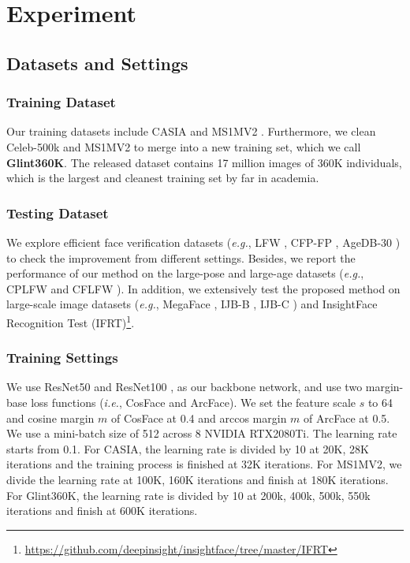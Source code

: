 \documentclass[letterpaper]{article} \usepackage{style/aaai21}  \usepackage{times}  \usepackage{helvet} \usepackage{courier}  \usepackage[hyphens]{url}  \usepackage{graphicx} \usepackage{color}
\begin{document}
\section{Experiment}
\subsection{Datasets and Settings}
\subsubsection{Training Dataset}
Our training datasets include CASIA \cite{liu2015deep} and MS1MV2 \cite{deng2019arcface}. Furthermore, we clean Celeb-500k \cite{cao2018celeb} and MS1MV2 to merge into a new training set, which we call \textbf{Glint360K}. The released dataset contains 17 million images of 360K individuals, which is the largest and cleanest training set by far in academia.

\subsubsection{Testing Dataset}
We explore efficient face verification datasets (\emph{e.g.}, LFW \cite{huang2008labeled}, CFP-FP \cite{sengupta2016frontal}, AgeDB-30 \cite{moschoglou2017agedb}) to check the improvement from different settings. Besides, we report the performance of our method on the large-pose and large-age datasets (\emph{e.g.}, CPLFW \cite{CPLFWTech} and CFLFW \cite{zheng2017cross}). In addition, we extensively test the proposed method on large-scale image datasets (\emph{e.g.}, MegaFace \cite{kemelmacher-shlizerman2016the}, IJB-B \cite{whitelam2017iarpa}, IJB-C \cite{maze2018iarpa}) and InsightFace Recognition Test (IFRT)\footnote{\url{https://github.com/deepinsight/insightface/tree/master/IFRT}}.
 


\subsubsection{Training Settings}

We use ResNet50 and ResNet100 \cite{deng2019arcface, he2016deep}, as our backbone network, and use two margin-base loss functions (\emph{i.e.}, CosFace and ArcFace). We set the feature scale $s$ to 64 and cosine margin $m$ of CosFace at 0.4 and arccos margin $m$ of ArcFace at 0.5. We use a mini-batch size of 512 across 8 NVIDIA RTX2080Ti. The learning rate starts from 0.1. For CASIA, the learning rate is divided by 10 at 20K, 28K iterations and the training process is finished at 32K iterations. For MS1MV2, we divide the learning rate at 100K, 160K iterations and finish at 180K iterations. For Glint360K, the learning rate is divided by 10 at 200k, 400k, 500k, 550k iterations and finish at 600K iterations.
\end{document}
